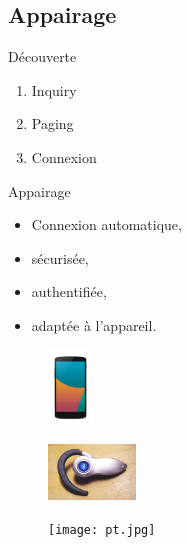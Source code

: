 \subsection{Appairage}
\begin{frame}
\begin{minipage}[t]{0.45\linewidth}
\begin{block}{Découverte}
	\begin{enumerate}
		\item Inquiry
		\item Paging
		\item Connexion
	\end{enumerate}
\end{block}
\begin{block}{Appairage}
	\begin{itemize}
		\item Connexion automatique,
		\item sécurisée,
		\item authentifiée,
		\item adaptée à l'appareil.
	\end{itemize}
\end{block}
\end{minipage}
\begin{minipage}[t]{0.45\linewidth}
\begin{figure}
\includegraphics[height=2cm]{nex_5.png}
\end{figure}

\begin{figure}
\includegraphics[height=1.5cm]{headset.jpg}
\end{figure}

\begin{figure}
\texttt{[image: pt.jpg]}
\end{figure}

\end{minipage}
\end{frame}

